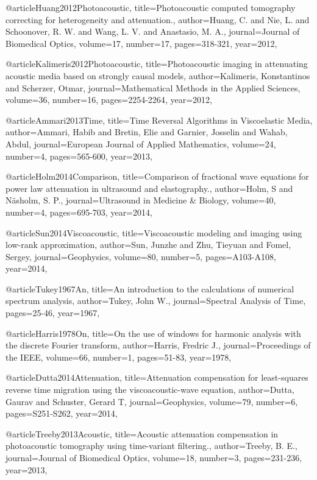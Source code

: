 {@article{Huang2012Photoacoustic,
  title={Photoacoustic computed tomography correcting for heterogeneity and attenuation.},
  author={Huang, C. and Nie, L. and Schoonover, R. W. and Wang, L. V. and Anastasio, M. A.},
  journal={Journal of Biomedical Optics},
  volume={17},
  number={17},
  pages={318-321},
  year={2012},
}

@article{Kalimeris2012Photoacoustic,
  title={Photoacoustic imaging in attenuating acoustic media based on strongly causal models},
  author={Kalimeris, Konstantinos and Scherzer, Otmar},
  journal={Mathematical Methods in the Applied Sciences},
  volume={36},
  number={16},
  pages={2254-2264},
  year={2012},
}

@article{Ammari2013Time,
  title={Time Reversal Algorithms in Viscoelastic Media},
  author={Ammari, Habib and Bretin, Elie and Garnier, Josselin and Wahab, Abdul},
  journal={European Journal of Applied Mathematics},
  volume={24},
  number={4},
  pages={565-600},
  year={2013},
}

@article{Holm2014Comparison,
  title={Comparison of fractional wave equations for power law attenuation in ultrasound and elastography.},
  author={Holm, S and Näsholm, S. P.},
  journal={Ultrasound in Medicine \& Biology},
  volume={40},
  number={4},
  pages={695-703},
  year={2014},
}

@article{Sun2014Viscoacoustic,
  title={Viscoacoustic modeling and imaging using low-rank approximation},
  author={Sun, Junzhe and Zhu, Tieyuan and Fomel, Sergey},
  journal={Geophysics},
  volume={80},
  number={5},
  pages={A103-A108},
  year={2014},
}

@article{Tukey1967An,
  title={An introduction to the calculations of numerical spectrum analysis},
  author={Tukey, John W.},
  journal={Spectral Analysis of Time},
  pages={25-46},
  year={1967},
}

@article{Harris1978On,
  title={On the use of windows for harmonic analysis with the discrete {F}ourier transform},
  author={Harris, Fredric J.},
  journal={Proceedings of the IEEE},
  volume={66},
  number={1},
  pages={51-83},
  year={1978},
}

@article{Dutta2014Attenuation,
  title={Attenuation compensation for least-squares reverse time migration using the viscoacoustic-wave equation},
  author={Dutta, Gaurav and Schuster, Gerard T},
  journal={Geophysics},
  volume={79},
  number={6},
  pages={S251-S262},
  year={2014},
}

@article{Treeby2013Acoustic,
  title={Acoustic attenuation compensation in photoacoustic tomography using time-variant filtering.},
  author={Treeby, B. E.},
  journal={Journal of Biomedical Optics},
  volume={18},
  number={3},
  pages={231-236},
  year={2013},
}

}
